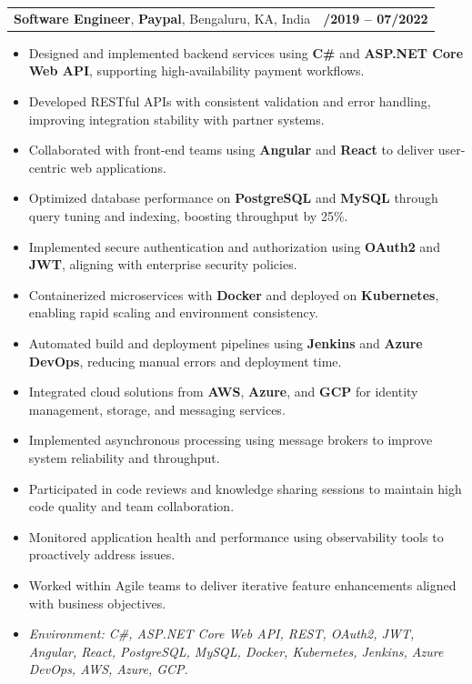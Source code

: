 \documentclass[letterpaper,11pt]{article}
\makeatletter
\newcommand{\resumeItem}[1]{
  \item\footnotesize{
    {#1 \vspace{-2pt}}
  }
}
\newcommand{\resumeSubheading}[4]{
  \vspace{-2pt}\item
    \begin{tabular*}{1.0\textwidth}[t]{l@{\extracolsep{\fill}}r}
      \textbf{\fontsize{10pt}{14pt}\selectfont #3}, \textbf{\fontsize{10pt}{14pt}\selectfont #1}, \fontsize{10pt}{14pt}\selectfont #4 & \textbf{\fontsize{10pt}{14pt}\selectfont #2} \\
    \end{tabular*}\vspace{-7pt}
}
\newcommand{\resumeItemListStart}{\begin{itemize}[leftmargin=*]}
\newcommand{\resumeItemListEnd}{\end{itemize}\vspace{-5pt}}
\makeatother
\begin{document}
\resumeSubheading
{Paypal}{08/2019 -- 07/2022}
{Software Engineer}{Bengaluru, KA, India}
\resumeItemListStart
  \resumeItem{Designed and implemented backend services using \textbf{C\#} and \textbf{ASP.NET Core Web API}, supporting high-availability payment workflows.}
  \resumeItem{Developed RESTful APIs with consistent validation and error handling, improving integration stability with partner systems.}
  \resumeItem{Collaborated with front-end teams using \textbf{Angular} and \textbf{React} to deliver user-centric web applications.}
  \resumeItem{Optimized database performance on \textbf{PostgreSQL} and \textbf{MySQL} through query tuning and indexing, boosting throughput by 25\%.}
  \resumeItem{Implemented secure authentication and authorization using \textbf{OAuth2} and \textbf{JWT}, aligning with enterprise security policies.}
  \resumeItem{Containerized microservices with \textbf{Docker} and deployed on \textbf{Kubernetes}, enabling rapid scaling and environment consistency.}
  \resumeItem{Automated build and deployment pipelines using \textbf{Jenkins} and \textbf{Azure DevOps}, reducing manual errors and deployment time.}
  \resumeItem{Integrated cloud solutions from \textbf{AWS}, \textbf{Azure}, and \textbf{GCP} for identity management, storage, and messaging services.}
  \resumeItem{Implemented asynchronous processing using message brokers to improve system reliability and throughput.}
  \resumeItem{Participated in code reviews and knowledge sharing sessions to maintain high code quality and team collaboration.}
  \resumeItem{Monitored application health and performance using observability tools to proactively address issues.}
  \resumeItem{Worked within Agile teams to deliver iterative feature enhancements aligned with business objectives.}
  \resumeItem{\textit{Environment: C\#, ASP.NET Core Web API, REST, OAuth2, JWT, Angular, React, PostgreSQL, MySQL, Docker, Kubernetes, Jenkins, Azure DevOps, AWS, Azure, GCP.}}
\resumeItemListEnd
\end{document}
